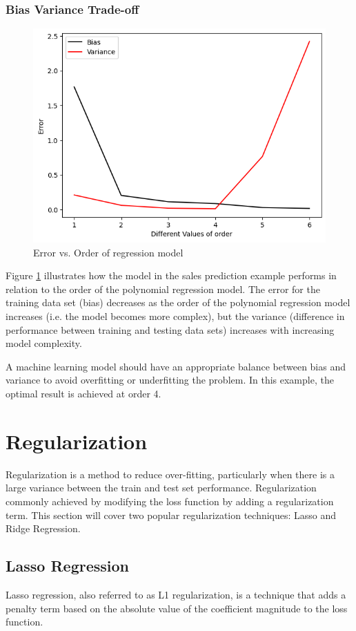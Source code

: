 {\subsubsection{\textbf{Bias Variance Trade-off}}
\begin{figure}[!ht]
  \centering
  \includegraphics[width=8 cm]{Bias_Variance.png}
  \caption{Error vs. Order of regression model}
  \label{fig:bias_vari}
\end{figure}

Figure \ref{fig:bias_vari} illustrates how the model in the sales prediction example performs in relation to the order of the polynomial regression model. The error for the training data set (bias) decreases as the order of the polynomial regression model increases (i.e. the model becomes more complex), but the variance (difference in performance between training and testing data sets) increases with increasing model complexity.

A machine learning model should have an appropriate balance between bias and variance to avoid overfitting or underfitting the problem. In this example, the optimal result is achieved at order 4.


\newpage
\section{Regularization}\label{sec:regularization}

Regularization is a method to reduce over-fitting, particularly when there is a large variance between the train and test set performance. Regularization commonly achieved by modifying the loss function by adding a regularization term. This section will cover two popular regularization techniques: Lasso and Ridge Regression.

\subsection{Lasso Regression}
Lasso regression, also referred to as L1 regularization, is a technique that adds a penalty term based on the absolute value of the coefficient magnitude to the loss function.

}
